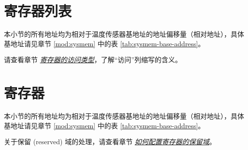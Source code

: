 \documentclass[main\_\_CN.tex]{subfiles}
\begin{document}
\newpage
\hypertarget{tmpsen-reg-summ}{}
\section{寄存器列表}
\label{sec:tmpsen-reg-summ}

本小节的所有地址均为相对于温度传感器基地址的地址偏移量（相对地址），具体基地址请见章节 \ref{mod:sysmem} \textit{} 中的表 \ref{tab:sysmem-base-address}。

请查看章节 \hyperref[glossary-access-types]{\textit{寄存器的访问类型}}，了解“访问”列缩写的含义。




\newpage
\section{寄存器}

本小节的所有地址均为相对于温度传感器基地址的地址偏移量（相对地址），具体基地址请见章节 \ref{mod:sysmem} \textit{} 中的表 \ref{tab:sysmem-base-address}。

关于保留 (reserved) 域的处理，请查看章节 \hyperref[programming-reserved-field]{\textit{如何配置寄存器的保留域}}。


\end{document}
